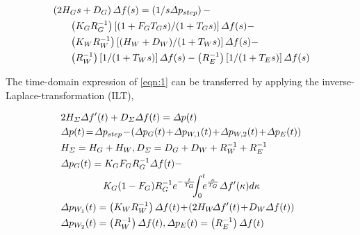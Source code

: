 \documentclass[lettersize,journal]{IEEEtran}
\newenvironment{newsubequations}{\small\begin{subequations}}{\end{subequations}}
\begin{document}
\vspace{-0.125in}
\begin{small}
	\begin{align}\label{eqn:1}
		 & \left(2 H_{G} s+D_{G}\right) \varDelta f(s)=\left({1/s} \varDelta p_{ {step}}\right)-                                                                          \\
		 & \qquad {\left({K_{G}}{ R_{G}^{-1}}\right)\left[ {\left(1+F_{G} T_{G} s\right)}/{\left(1+T_{G} s\right)}\right] \varDelta f(s)}- \notag                            \\
		 & \qquad {\left({K_W R_{W}^{-1}}\right)\left[{(H_W + D_W)}/{(1+T_{W} s)}\right] \varDelta f(s)} - \notag                                                            \\
		 & \qquad {\left({R_{W}^{-1}}\right)\left[{1}/({1+T_{W} s})\right] \varDelta f(s)} - {\left({R_{E}^{-1}}\right)\left[{1}/({1+T_{E} s})\right] \varDelta f(s)} \notag
	\end{align}
\end{small}

The time-domain expression of \eqref{eqn:1} can be transferred by applying the inverse-Laplace-transformation (ILT),

\vspace{-0.125in}
\begin{newsubequations}\label{eqn:2}
	\begin{align}
		 & 2H_{\varSigma } \varDelta f^{\prime}(t)  +D_{\varSigma} \varDelta f(t)=\varDelta p(t)  \label{eqn:2a}                                                                  \\
		 & \varDelta p(t) \! =\!\varDelta p_{step}\!-\!\left(\varDelta p_{G}(t)\!+\!\varDelta p_{W,1}(t)\!+\!\varDelta p_{W,2}(t)\!+\! \varDelta p_{E}(t)\right) \!\label{eqn:2b} \\
		 & H_{\varSigma}  =H_{G}+H_{W}, D_{\varSigma}  =D_{G}+D_{W}+{ R_{W}^{-1} } + { R_{E}^{-1}}   \label{eqn:2c}                                                               \\
		 & \varDelta p_{G}(t)   ={K_{G} F_{G}}{ R_{G}^{-1}} \varDelta f(t)- \notag                                                                                                \\
		 & \qquad\quad\quad\,\, {K_G(1-F_G)}{ R_{G}^{-1} }e^{-\frac{t}{T_G}} \!\!\!\int_{0}^{t}\!\!\! e^{\frac{\kappa}{T_G}} \varDelta f^{\prime}(\kappa) d \kappa \label{eqn:2d} \\
		 & \varDelta p_{W_1}(t) =\left(K_{W} {R_{W}^{-1}}\right) \varDelta f(t) \!+\! \left(2H_{W}\! \varDelta f^{\prime}(t) \!+\! D_{W}\varDelta f(t)\right)\label{eqn:2e}       \\
		 & \varDelta p_{W_2}(t)  =\left( { R_{W}^{-1}}\right) \varDelta f(t), \varDelta p_{E}(t)  =\left( { R_{E}^{-1}}\right) \varDelta f(t) \label{eqn:2f}
	\end{align}
\end{newsubequations}
\end{document}
